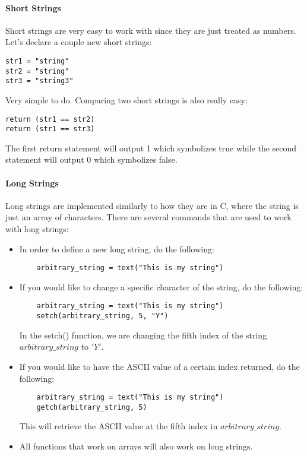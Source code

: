 \documentclass[12pt]{article}
\begin{document}
\paragraph{Short Strings}
	Short strings are very easy to work with since they are just treated as numbers. Let's declare a couple new short strings:
	
\begin{verbatim}
str1 = "string"
str2 = "string"
str3 = "string3"
\end{verbatim}

Very simple to do. Comparing two short strings is also really easy:

\begin{verbatim}
return (str1 == str2)
return (str1 == str3)
\end{verbatim}

The first return statement will output 1 which symbolizes true while the second statement will output 0 which symbolizes false. \cite{Serpent}

\paragraph{Long Strings}
Long strings are implemented similarly to how they are in C, where the string is just an array of characters. There are several commands that are used to work with long strings:

\begin{itemize}
\item In order to define a new long string, do the following:
	\begin{verbatim}
	arbitrary_string = text("This is my string")
	\end{verbatim}
\item If you would like to change a specific character of the string, do the following:
	\begin{verbatim}
	arbitrary_string = text("This is my string")
	setch(arbitrary_string, 5, "Y")
	\end{verbatim}
	In the setch() function, we are changing the fifth index of the string $arbitrary\_string$ to $'Y'$.
\item If you would like to have the ASCII value of a certain index returned, do the following:
	\begin{verbatim}
	arbitrary_string = text("This is my string")
	getch(arbitrary_string, 5)
	\end{verbatim}
	This will retrieve the ASCII value at the fifth index in $arbitrary\_string$.
\item All functions that work on arrays will also work on long strings.
\end{itemize} \cite{Serpent,Serpent1.0(old)}
\end{document}
